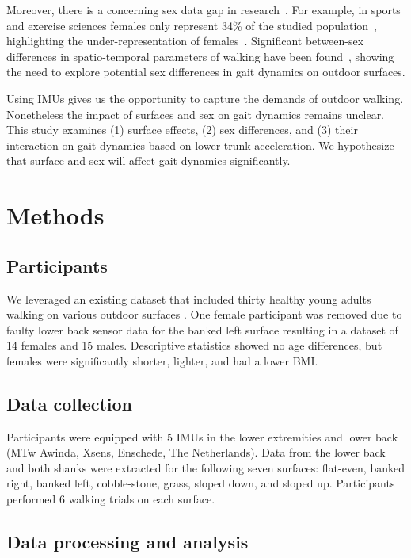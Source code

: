 \documentclass[authoryear,preprint,review,12pt]{elsarticle}
\begin{document}
Moreover, there is a concerning sex data gap in research~\citep{perez2019invisible}. For example, in sports and exercise sciences females only represent 34\% of the studied population~\citep{cowley2021invisible}, highlighting the under-representation of females~\citep{perez2019invisible, cowley2021invisible}. Significant between-sex differences in spatio-temporal parameters of walking have been found~\citep{auvinet2002reference}, showing the need to explore potential sex differences in gait dynamics on outdoor surfaces.

Using IMUs gives us the opportunity to capture the demands of outdoor walking. Nonetheless the impact of surfaces and sex on gait dynamics remains unclear. This study examines (1) surface effects, (2) sex differences, and (3) their interaction on gait dynamics based on  lower trunk acceleration. We hypothesize that surface and sex will affect gait dynamics significantly. 

\section{Methods}
\label{methods}
\subsection{Participants}
We leveraged an existing dataset that included thirty healthy young adults walking on various outdoor surfaces \citep{luo_database_2020}.
One female participant was removed due to faulty lower back sensor data for the banked left surface resulting in a dataset of 14 females and 15 males. Descriptive statistics showed no age differences, but females were significantly shorter, lighter, and had a lower BMI. 


\subsection{Data collection}
Participants were equipped with 5 IMUs in the lower extremities and lower back (MTw Awinda, Xsens, Enschede, The Netherlands). Data from the lower back and both shanks were extracted for the following seven surfaces: flat-even, banked right, banked left, cobble-stone, grass, sloped down, and sloped up. Participants performed 6 walking trials on each surface.

\subsection{Data processing and analysis}
\end{document}

